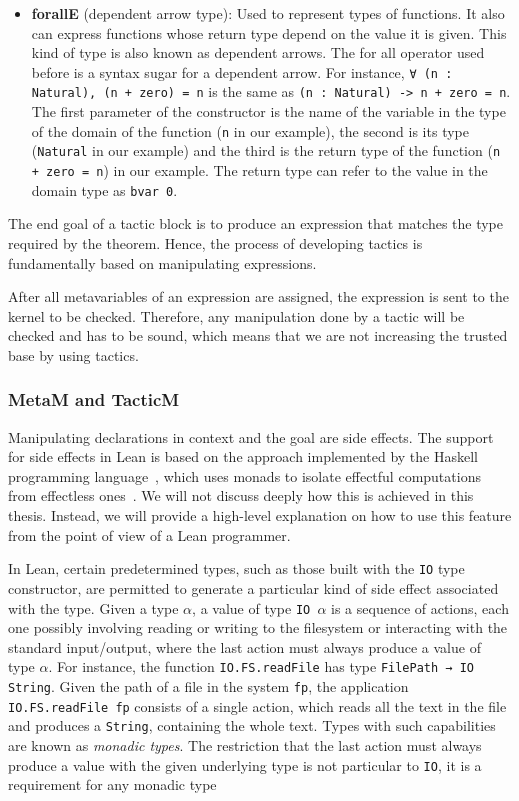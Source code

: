 \begin{itemize}
  \item \textbf{forallE} (dependent arrow type): Used to represent types of functions. It also can express functions whose return type depend on the value it is given. This kind of type is also known as dependent arrows. The for all operator used before is a syntax sugar for a dependent arrow. For instance, \texttt{∀ (n : Natural), (n + zero) = n} is the same as \texttt{(n : Natural) -> n + zero = n}. The first parameter of the constructor is the name of the variable in the type of the domain of the function (\texttt{n} in our example), the second is its type (\texttt{Natural} in our example) and the third is the return type of the function (\texttt{n + zero = n}) in our example. The return type can refer to the value in the domain type as \texttt{bvar 0}.
\end{itemize}

The end goal of a tactic block is to produce an expression that matches the type required by the theorem. Hence, the process of developing tactics is fundamentally based on manipulating expressions.

After all metavariables of an expression are assigned, the expression is sent to the kernel to be checked. Therefore, any manipulation done by a tactic will be checked and has to be sound, which means that we are not increasing the trusted base by using tactics.

\subsubsection{MetaM and TacticM}

Manipulating declarations in context and the goal are side effects. The support for side effects in Lean is based on the approach implemented by the Haskell programming language~\cite{haskell}, which uses monads to isolate effectful computations from effectless ones~\cite{imperativeFunctional}. We will not discuss deeply how this is achieved in this thesis. Instead, we will provide a high-level explanation on how to use this feature from the point of view of a Lean programmer.

In Lean, certain predetermined types, such as those built with the \texttt{IO} type constructor, are permitted to generate a particular kind of side effect associated with the type.
Given a type \texttt{$\alpha$}, a value of type \texttt{IO $\alpha$} is a sequence of actions, each one possibly involving reading or writing to the
filesystem or interacting with the standard input/output, where the last action must always produce a value of type \texttt{$\alpha$}. For instance,
the function \texttt{IO.FS.readFile} has type \texttt{FilePath → IO String}. Given the path of a file in the system \texttt{fp}, the application \texttt{IO.FS.readFile fp} consists of a single action, which reads all the text in the file and produces a \texttt{String}, containing the whole text. Types with such capabilities are known as \textit{monadic types}. The restriction that the last action must always produce a value with the given underlying type is not particular to \texttt{IO}, it is a requirement for any monadic type

